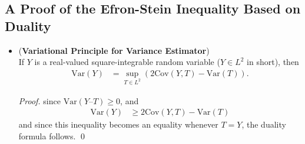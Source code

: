 \documentclass[11pt]{article}
\begin{document}
\subsection{A Proof of the Efron-Stein Inequality Based on Duality}
\begin{itemize}
\item \begin{proposition} (\textbf{Variational Principle for Variance Estimator}) \citep{boucheron2013concentration}\\
If $Y$ is a real-valued square-integrable random variable ($Y \in L^2$ in short), then
\begin{align}
\text{Var}(Y) &= \sup_{T\in L^2}(2 \text{Cov}(Y, T) - \text{Var}(T)) . \label{eqn: variational_variance}
\end{align}
\end{proposition}
\begin{proof}
since $\text{Var}(Y – T) \ge 0$, and
\begin{align*}
\text{Var}(Y) &\ge 2 \text{Cov}(Y, T) - \text{Var}(T)
\end{align*} and since this inequality becomes an equality whenever $T = Y$, the duality formula follows. \qed
\end{proof}


\end{itemize}
\end{document}
